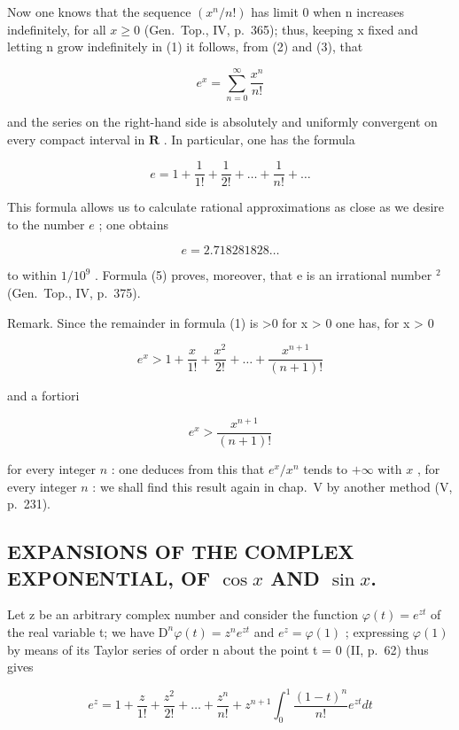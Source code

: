 Now one knows that the sequence \((x^{n}/n!)\) has limit 0 when n increases indefinitely, for all \(x \geqslant 0\) (Gen.~Top., IV, p.~365); thus, keeping x fixed and letting n grow indefinitely in (1) it follows, from (2) and (3), that

\[
e ^ {x} = \sum_ {n = 0} ^ {\infty} \frac {x ^ {n}}{n !}\tag{4}
\]

and the series on the right-hand side is absolutely and uniformly convergent on every compact interval in \(\mathbf{R}\) . In particular, one has the formula

\[
e = 1 + \frac {1}{1 !} + \frac {1}{2 !} + \dots + \frac {1}{n !} + \dots\tag{5}
\]

This formula allows us to calculate rational approximations as close as we desire to the number \(e\) ; one obtains

\[
e = 2. 7 1 8   2 8 1   8 2 8 \dots
\]

to within \(1/10^{9}\) . Formula (5) proves, moreover, that e is an irrational number \(^{2}\) (Gen.~Top., IV, p.~375).

Remark. Since the remainder in formula (1) is \textgreater0 for x \textgreater{} 0 one has, for x \textgreater{} 0

\[
e ^ {x} > 1 + \frac {x}{1 !} + \frac {x ^ {2}}{2 !} + \dots + \frac {x ^ {n + 1}}{(n + 1) !}
\]

and a fortiori

\[
e ^ {x} > \frac {x ^ {n + 1}}{(n + 1) !}
\]

for every integer \(n\) : one deduces from this that \(e^x / x^n\) tends to \(+\infty\) with \(x\) , for every integer \(n\) : we shall find this result again in chap.~V by another method (V, p.~231).

\subsection{\texorpdfstring{EXPANSIONS OF THE COMPLEX EXPONENTIAL, OF \(\cos x\) AND \(\sin x\).}{EXPANSIONS OF THE COMPLEX EXPONENTIAL, OF COS X AND SIN X}}

Let z be an arbitrary complex number and consider the function \(\varphi(t) = e^{zt}\) of the real variable t; we have \(\mathrm{D}^{n}\varphi(t) = z^{n}e^{zt}\) and \(e^{z} = \varphi(1)\) ; expressing \(\varphi(1)\) by means of its Taylor series of order n about the point t = 0 (II, p.~62) thus gives

\[
e ^ {z} = 1 + \frac {z}{1 !} + \frac {z ^ {2}}{2 !} + \dots + \frac {z ^ {n}}{n !} + z ^ {n + 1} \int_ {0} ^ {1} \frac {(1 - t) ^ {n}}{n !} e ^ {z t} d t\tag{6}
\]

